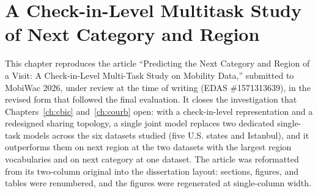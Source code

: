 \chapter[A Check-in-Level Multitask Study of Next Category and Region]{A Check-in-Level Multitask Study of Next Category and Region}
\label{ch:mobiwac}

\begin{chapterpreface}
This chapter reproduces the article ``Predicting the Next Category and Region of a
Visit: A Check-in-Level Multi-Task Study on Mobility Data,'' submitted to MobiWac
2026, under review at the time of writing (EDAS \#1571313639), in the revised form
that followed the final evaluation. It closes the
investigation that Chapters~\ref{ch:cbic} and~\ref{ch:courb} open: with a
check-in-level representation and a redesigned sharing topology, a single joint
model replaces two dedicated single-task
models across the six datasets studied (five U.S. states and Istanbul), and it
outperforms them on next region at the two datasets with the largest region
vocabularies and on next category at one dataset. The article was
reformatted from its two-column original into the dissertation layout: sections,
figures, and tables were renumbered, and the figures were regenerated at
single-column width.
\end{chapterpreface}









